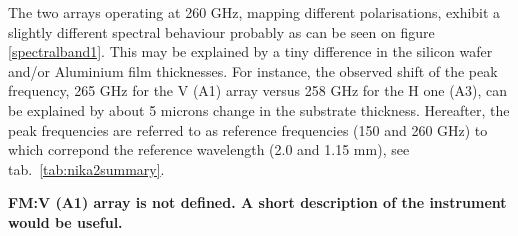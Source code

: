 The two arrays operating at 260 GHz, mapping different polarisations, exhibit a slightly different
spectral behaviour probably as can be seen on figure \ref{spectralband1}. This may be explained 
by a tiny difference in the silicon wafer and/or Aluminium film thicknesses. For instance, the observed
shift of the peak frequency, 265 GHz for the V (A1) array versus
258 GHz for the H one (A3), can be explained by about 5 microns change in the substrate thickness. Hereafter, the peak 
frequencies are
referred to as reference frequencies (150 and 260 GHz) to which correpond the reference wavelength 
(2.0  and 1.15 mm), see tab.~\ref{tab:nika2summary}.

{\bf FM:V (A1) array is not defined. A short description of the instrument would be useful.}



